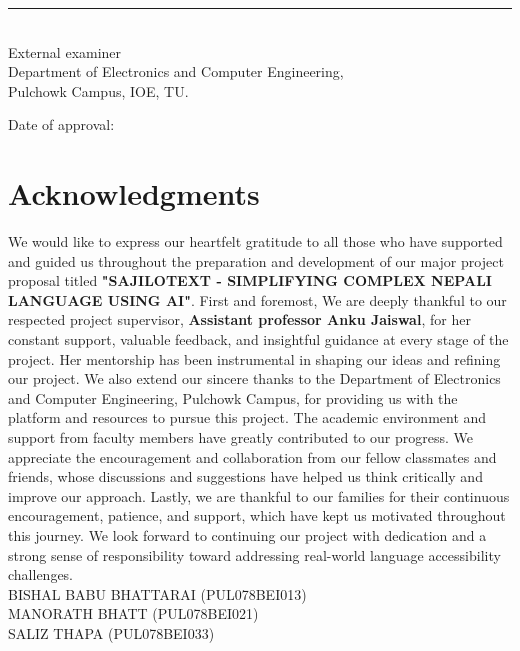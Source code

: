 \documentclass[12pt]{report}
\begin{document}
\vspace{1.2cm}

\begin{center}
    \rule{4cm}{0.4pt}\\
    External examiner\\[0.2cm]
    Department of Electronics and Computer Engineering,\\
    Pulchowk Campus, IOE, TU.
\end{center}

\vspace{0.8cm}

\begin{center}
    Date of approval:
\end{center}


\chapter*{Acknowledgments}

We would like to express our heartfelt gratitude to all those who have supported and guided us throughout the preparation and development of our major project proposal titled \textbf{"SAJILOTEXT - SIMPLIFYING COMPLEX NEPALI LANGUAGE USING AI"}. First and foremost, We are deeply thankful to our respected project supervisor, \textbf{Assistant professor Anku Jaiswal}, for her constant support, valuable feedback, and insightful guidance at every stage of the project. Her mentorship has been instrumental in shaping our ideas and refining our project. We also extend our sincere thanks to the Department of Electronics and Computer Engineering, Pulchowk Campus, for providing us with the platform and resources to pursue this project. The academic environment and support from faculty members have greatly contributed to our progress. We appreciate the encouragement and collaboration from our fellow classmates and friends, whose discussions and suggestions have helped us think critically and improve our approach. Lastly, we are thankful to our families for their continuous encouragement, patience, and support, which have kept us motivated throughout this journey. We look forward to continuing our project with dedication and a strong sense of responsibility toward addressing real-world language accessibility challenges.\vspace{2 cm} \\ BISHAL BABU BHATTARAI (PUL078BEI013)\\
MANORATH BHATT (PUL078BEI021)\\
SALIZ THAPA (PUL078BEI033)
\end{document}
